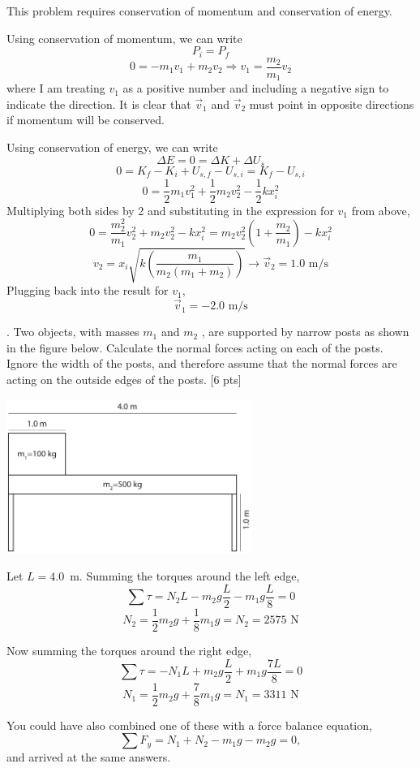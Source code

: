 \documentclass[11pt,letterpaper]{article}
\newcommand{\sol}[1]{{\color{White} #1}} %
\begin{document}
\sol{This problem requires conservation of momentum and conservation of energy. 

Using conservation of momentum, we can write
$$P_i = P_f$$
$$0 = -m_1v_1 + m_2v_2 \Rightarrow v_1 = \frac{m_2}{m_1}v_2$$
where I am treating $v_1$ as a positive number and including a negative sign to indicate the direction. It is clear that $\vec{v}_1$ and $\vec{v}_2$ must point in opposite directions if momentum will be conserved.

Using conservation of energy, we can write
$$\Delta E = 0 = \Delta K + \Delta U_s$$
$$0 = K_f-K_i + U_{s,f}-U_{s,i} = K_f - U_{s,i}$$
$$0 = \frac{1}{2}m_1v_1^2 + \frac{1}{2}m_2v_2^2 - \frac{1}{2}kx_i^2$$ 
Multiplying both sides by 2 and substituting in the expression for $v_1$ from above,
$$0 = \frac{m_2^2}{m_1}v_2^2+m_2v_2^2 - kx_i^2 = m_2v_2^2\left(1+\frac{m_2}{m_1}\right) - kx_i^2$$
$$ v_2 = x_i\sqrt{k\left(\frac{m_1}{m_2(m_1+m_2)}\right)} \rightarrow \boxed{\vec{v}_2=1.0\mbox{ m/s}}$$
Plugging back into the result for $v_1$,
$$\boxed{\vec{v}_1=-2.0\mbox{ m/s}}$$

}

. Two objects, with masses $m_1$ and $m_2$ , are supported by narrow posts as shown in the figure below. Calculate the normal forces acting on each of the posts. Ignore the width of the posts, and therefore assume that the normal forces are acting on the outside edges of the posts. [6 pts]

\includegraphics[width=8cm]{./exam2_5.pdf}

\sol{Let $L=4.0$~m. Summing the torques around the left edge,
$$\sum \tau = N_2L - m_2g\frac{L}{2} - m_1g\frac{L}{8} = 0$$
$$N_2 = \frac{1}{2}m_2g+\frac{1}{8}m_1g = \boxed{N_2 = 2575\mbox{ N}}$$

Now summing the torques around the right edge,
$$\sum \tau = -N_1L + m_2g\frac{L}{2} + m_1g\frac{7L}{8} = 0$$
$$N_1 = \frac{1}{2}m_2g + \frac{7}{8}m_1g = \boxed{N_1 = 3311 \mbox{ N}}$$

You could have also combined one of these with a force balance equation,
$$\sum F_y = N_1+N_2-m_1g-m_2g = 0,$$
and arrived at the same answers.

}
\end{document}
